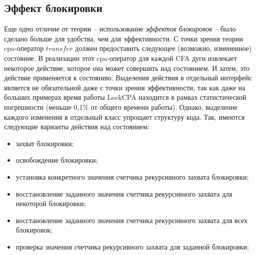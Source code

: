 \subsection{Эффект блокировки}
Еще одно отличие от теории -- использование \textit{эффектов блокировок} -- было сделано больше для удобства, чем для эффективности.
С точки зрения теории cpa-оператор $transfer$ должен предоставить следующее (возможно, измененное) состояние.
В реализации этот cpa-оператор для каждой CFA дуги извлекает некоторое действие, которое она может совершить над состоянием. 
И затем, это действие применяется к состоянию. 
Выделения действия в отдельный интерфейс является не обязательной даже с точки зрения эффективности, так как даже на больших примерах время работы LockCPA находится в рамках статистической погрешности (меньше 0,1\% от общего времени работы).
Однако, выделение каждого изменения в отдельный класс упрощает структуру кода.
Так, имеются следующие варианты действия над состоянием:
\begin{itemize}
\item захват блокировки;
\item освобождение блокировки;
\item установка конкретного значения счетчика рекурсивного захвата блокировки;
\item восстановление заданного значения счетчика рекурсивного захвата для некоторой блокировки;
\item восстановление заданного значения счетчика рекурсивного захвата для всех блокировок;
\item проверка значения счетчика рекурсивного захвата для заданной блокировки;
\end{itemize}

